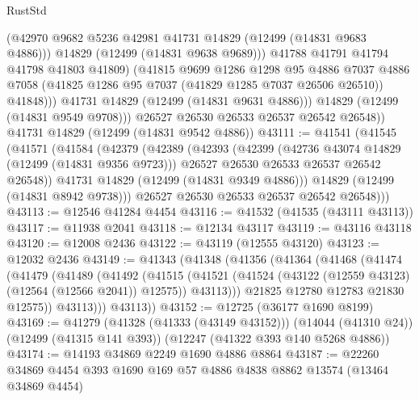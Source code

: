 \begin{lexlean}{RustStd}
\begin{coremodule}
                    (@42970 @9682 @5236 @42981 @41731 @14829 (@12499 (@14831 @9683 @4886)))
                    @14829
                    (@12499 (@14831 @9638 @9689)))
                  @41788
                  @41791
                  @41794
                  @41798
                  @41803
                  @41809)
                (@41815
                  @9699
                  @1286
                  @1298
                  @95
                  @4886
                  @7037
                  @4886
                  @7058
                  (@41825 @1286 @95 @7037 (@41829 @1285 @7037 @26506 @26510))
                  @41848)))
            @41731
            @14829
            (@12499 (@14831 @9631 @4886)))
          @14829
          (@12499 (@14831 @9549 @9708)))
        @26527
        @26530
        @26533
        @26537
        @26542
        @26548))
    @41731
    @14829
    (@12499 (@14831 @9542 @4886))
@43111 := @41541
    (@41545
      (@41571
        (@41584
          (@42379
            (@42389
              (@42393
                (@42399
                  (@42736 @43074 @14829 (@12499 (@14831 @9356 @9723)))
                  @26527
                  @26530
                  @26533
                  @26537
                  @26542
                  @26548))
              @41731
              @14829
              (@12499 (@14831 @9349 @4886)))
            @14829
            (@12499 (@14831 @8942 @9738)))
          @26527
          @26530
          @26533
          @26537
          @26542
          @26548)))
@43113 := @12546 @41284 @4454
@43116 := @41532 (@41535 (@43111 @43113))
@43117 := @11938 @2041
@43118 := @12134 @43117
@43119 := @43116 @43118
@43120 := @12008 @2436
@43122 := @43119 (@12555 @43120)
@43123 := @12032 @2436
@43149 := @41343
    (@41348
      (@41356
        (@41364
          (@41468
            (@41474
              (@41479
                (@41489
                  (@41492
                    (@41515
                      (@41521
                        (@41524 (@43122 (@12559 @43123) (@12564 (@12566 @2041)) @12575))
                        @43113)))
                  @21825
                  @12780
                  @12783
                  @21830
                  @12575))
              @43113)))
        @43113))
@43152 := @12725 (@36177 @1690 @8199)
@43169 := @41279
    (@41328 (@41333 (@43149 @43152)))
    (@14044 (@41310 @24))
    (@12499 (@41315 @141 @393))
    (@12247 (@41322 @393 @140 @5268 @4886))
@43174 := @14193 @34869 @2249 @1690 @4886 @8864
@43187 := @22260 @34869 @4454 @393 @1690 @169 @57 @4886 @4838 @8862 @13574 (@13464 @34869 @4454)

\end{coremodule}
\end{lexlean}
